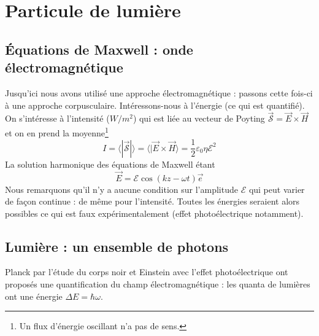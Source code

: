 	\newpage
	\section{Particule de lumière}
	\subsection{Équations de Maxwell : onde électromagnétique}
	Jusqu'ici nous avons utilisé une approche électromagnétique : passons cette fois-ci à une approche
	corpusculaire. Intéressons-nous à l'énergie (ce qui est quantifié). On s'intéresse à l'intensité ($W
	/m^2$) qui est liée au vecteur de Poyting $\vec{\mathcal{S}}=\vec{E}\times\vec{H}$ et on en prend la
	moyenne\footnote{Un flux d'énergie oscillant n'a pas de sens.} 
	\begin{equation}
	I = \langle|\vec{\mathcal{S}}|\rangle = \langle|\vec{E}\times\vec{H}\rangle = \frac{1}{2}\varepsilon_0
	\eta\mathcal{E}^2
\end{equation}		
	La solution harmonique des équations de Maxwell étant
	\begin{equation}
	\vec{E} = \mathcal{E}\cos(kz-\omega t)\vec{e}
	\end{equation}
	Nous remarquons qu'il n'y a aucune condition sur l'amplitude $\mathcal{E}$ qui peut varier de façon 
	continue : de même pour l'intensité. Toutes les énergies seraient alors possibles ce qui est faux 
	expérimentalement (effet photoélectrique notamment). 
	
	\subsection{Lumière : un ensemble de photons}
	Planck par l'étude du corps noir et Einstein avec l'effet photoélectrique ont proposés une quantification
	du champ électromagnétique : les quanta de lumières ont une énergie $\Delta E = \hbar\omega$.
	
